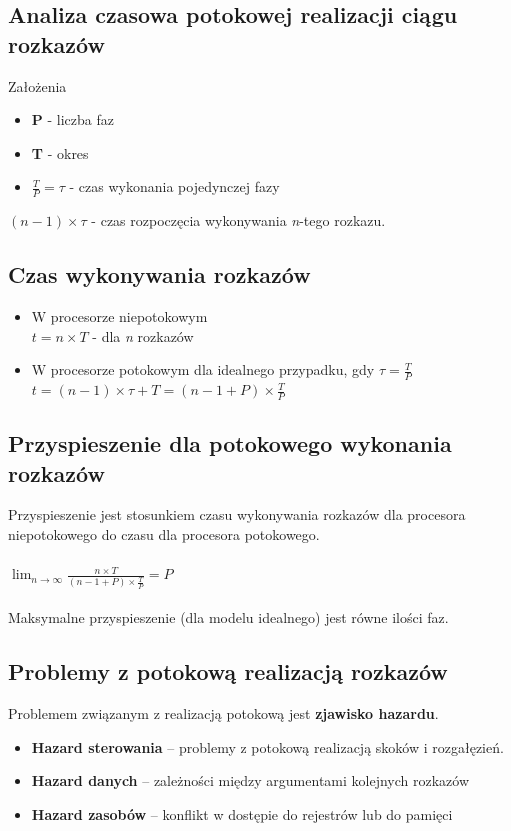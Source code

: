 \documentclass[a4paper,twoside]{article}
\begin{document}
    	\subsection*{Analiza czasowa potokowej realizacji ciągu rozkazów}
    	Założenia
    	\begin{itemize}
    		\item \textbf{P} - liczba faz
    		\item \textbf{T} - okres
    		\item $\frac{T}{P}=\tau $ - czas wykonania pojedynczej fazy
    	\end{itemize}
    	$(n-1)\times\tau$ - czas rozpoczęcia wykonywania \emph{n}-tego rozkazu.
    	\subsection*{Czas wykonywania rozkazów}
    	\begin{itemize}
    		\item W procesorze niepotokowym\\
    		$t=n\times T$ - dla \emph{n} rozkazów
    		\item W procesorze potokowym dla idealnego przypadku, gdy $\tau=\frac{T}{P}$\\
    		$t=(n-1)\times\tau+T=(n-1+P)\times\frac{T}{P}$
    	\end{itemize}
    	\subsection*{Przyspieszenie dla potokowego wykonania rozkazów}
    	Przyspieszenie jest stosunkiem czasu wykonywania rozkazów dla procesora niepotokowego do czasu dla procesora potokowego.\\\\
    	$\lim_{n \to \infty}\frac{n\times T}{(n-1+P)\times\frac{T}{P}}=P$\\\\
    	Maksymalne przyspieszenie (dla modelu idealnego) jest równe ilości faz.
    	\subsection*{Problemy z potokową realizacją rozkazów}
    	Problemem związanym z realizacją potokową jest \textbf{zjawisko hazardu}.
    	\begin{itemize}
    		\item \textbf{Hazard sterowania }– problemy z potokową realizacją skoków i rozgałęzień.
    		\item \textbf{Hazard danych} – zależności między argumentami kolejnych rozkazów
    		\item \textbf{Hazard zasobów} – konflikt w dostępie do rejestrów lub do pamięci
    	\end{itemize}
\end{document}

